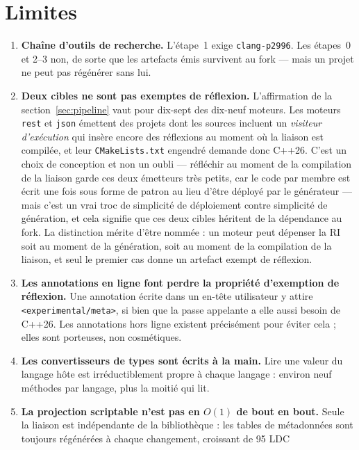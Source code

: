 \documentclass[11pt,a4paper]{article}
\newcommand{\code}[1]{\texttt{\small #1}}
\begin{document}
\section{Limites}
\label{sec:limitations}

\begin{enumerate}
  \item \textbf{Chaîne d'outils de recherche.} L'étape~1 exige
    \code{clang-p2996}. Les étapes~0 et 2--3 non, de sorte que les artefacts émis
    survivent au fork --- mais un projet ne peut pas régénérer sans lui.
  \item \textbf{Deux cibles ne sont pas exemptes de réflexion.} L'affirmation de
    la section~\ref{sec:pipeline} vaut pour dix-sept des dix-neuf moteurs. Les
    moteurs \code{rest} et \code{json} émettent des projets dont les sources
    incluent un \emph{visiteur d'exécution} qui insère encore des réflexions au
    moment où la liaison est compilée, et leur \code{CMakeLists.txt} engendré
    demande donc C++26. C'est un choix de conception et non un oubli ---
    réfléchir au moment de la compilation de la liaison garde ces deux émetteurs
    très petits, car le code par membre est écrit une fois sous forme de patron
    au lieu d'être déployé par le générateur --- mais c'est un vrai troc de
    simplicité de déploiement contre simplicité de génération, et cela signifie
    que ces deux cibles héritent de la dépendance au fork. La distinction mérite
    d'être nommée : un moteur peut dépenser la RI soit au moment de la
    génération, soit au moment de la compilation de la liaison, et seul le
    premier cas donne un artefact exempt de réflexion.
  \item \textbf{Les annotations en ligne font perdre la propriété d'exemption de
    réflexion.} Une annotation écrite dans un en-tête utilisateur y attire
    \code{<experimental/meta>}, si bien que la passe appelante a elle aussi
    besoin de C++26. Les annotations hors ligne existent précisément pour éviter
    cela ; elles sont porteuses, non cosmétiques.
  \item \textbf{Les convertisseurs de types sont écrits à la main.} Lire une
    valeur du langage hôte est irréductiblement propre à chaque langage :
    environ neuf méthodes par langage, plus la moitié qui lit.
  \item \textbf{La projection scriptable n'est pas en $O(1)$ de bout en bout.}
    Seule la liaison est indépendante de la bibliothèque : les tables de
    métadonnées sont toujours régénérées à chaque changement, croissant de 95 LDC

\end{enumerate}
\end{document}
